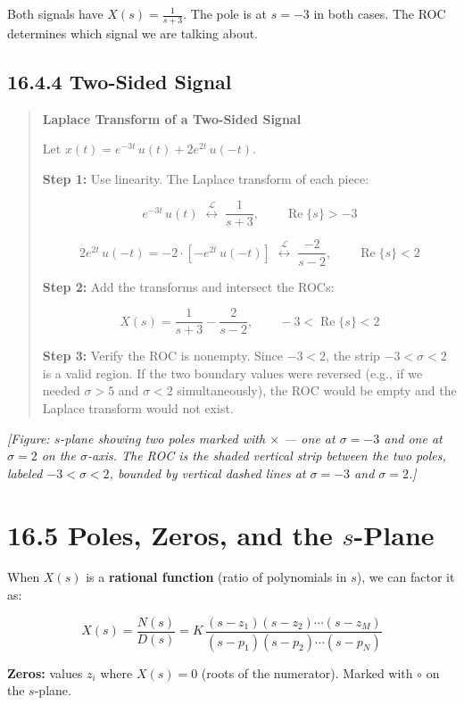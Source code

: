 \documentclass[11pt]{article}
\begin{document}
Both signals have $X(s) = \frac{1}{s+3}$. The pole is at $s = -3$ in both cases. The ROC determines which signal we are talking about.

\subsection*{16.4.4 Two-Sided Signal}

\begin{quote}
\textbf{Laplace Transform of a Two-Sided Signal}

Let $x(t) = e^{-3t}\,u(t) + 2e^{2t}\,u(-t)$.

\textbf{Step 1:} Use linearity. The Laplace transform of each piece:

\[e^{-3t}\,u(t) \;\overset{\mathcal{L}}{\longleftrightarrow}\; \frac{1}{s+3}, \qquad \operatorname{Re}\{s\} > -3\]

\[2e^{2t}\,u(-t) = -2 \cdot \left[-e^{2t}\,u(-t)\right] \;\overset{\mathcal{L}}{\longleftrightarrow}\; \frac{-2}{s-2}, \qquad \operatorname{Re}\{s\} < 2\]

\textbf{Step 2:} Add the transforms and intersect the ROCs:

\[X(s) = \frac{1}{s+3} - \frac{2}{s-2}, \qquad -3 < \operatorname{Re}\{s\} < 2\]

\textbf{Step 3:} Verify the ROC is nonempty. Since $-3 < 2$, the strip $-3 < \sigma < 2$ is a valid region. If the two boundary values were reversed (e.g., if we needed $\sigma > 5$ and $\sigma < 2$ simultaneously), the ROC would be empty and the Laplace transform would not exist.
\end{quote}

\textit{[Figure: $s$-plane showing two poles marked with $\times$ — one at $\sigma = -3$ and one at $\sigma = 2$ on the $\sigma$-axis. The ROC is the shaded vertical strip between the two poles, labeled $-3 < \sigma < 2$, bounded by vertical dashed lines at $\sigma = -3$ and $\sigma = 2$.]}

\section*{16.5 Poles, Zeros, and the $s$-Plane}

When $X(s)$ is a \textbf{rational function} (ratio of polynomials in $s$), we can factor it as:

\[X(s) = \frac{N(s)}{D(s)} = K\,\frac{(s - z_1)(s - z_2)\cdots(s - z_M)}{(s - p_1)(s - p_2)\cdots(s - p_N)}\]

\textbf{Zeros:} values $z_i$ where $X(s) = 0$ (roots of the numerator). Marked with $\circ$ on the $s$-plane.
\end{document}
